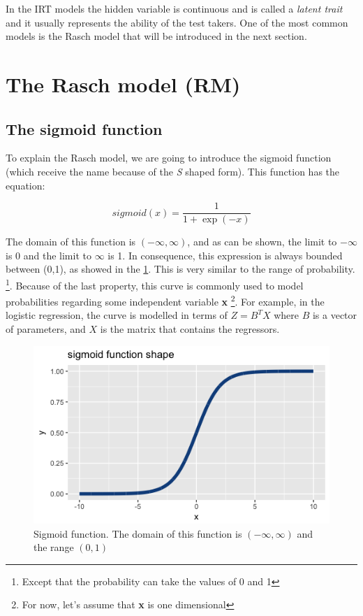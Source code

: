 In the IRT models the hidden variable is continuous and is called a \textit{latent trait} and it usually represents the ability of the test takers. One of the most common models is the Rasch model that will be introduced in the next section.

\section{The Rasch model (RM)}

\subsection{The sigmoid function}

To explain the Rasch model, we are going to introduce the sigmoid function (which receive the name because of the \textit{S} shaped form). This function has the equation:

\begin{equation}\label{eq:rasch1}
 sigmoid(x) = \frac{1}{1+\exp(-x)}
\end{equation}
\vspace{2 mm}

The domain of this function is $(-\infty, \infty)$, and as can be shown, the limit to $-\infty$ is $0$ and the limit to $\infty$ is 1. In consequence, this expression is always bounded between (0,1), as showed in the \cref{img:sigmoid1}. This is very similar to the range of probability. \footnote{Except that the probability can take the values of 0 and 1}. Because of the last property, this curve is commonly used to model probabilities regarding some independent variable \textbf{x} \footnote{For now, let's assume that \textbf{x} is one dimensional}. For example, in the logistic regression, the curve is modelled in terms of $Z = B^T X$ where $B$ is a vector of parameters, and $X$ is the matrix that contains the regressors.

\begin{figure}[ht!]
  \centering
  \includegraphics[width=.75\linewidth]{img/sigmoid.png}
  \caption{Sigmoid function. The domain of this function is $(-\infty, \infty)$ and the range $(0,1)$}
  \label{img:sigmoid1}
\end{figure}


